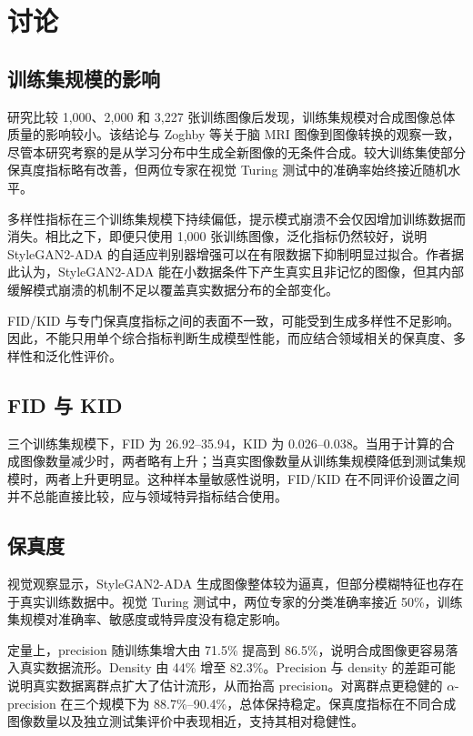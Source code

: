 \documentclass[UTF8,11pt,a4paper]{ctexart}
\begin{document}
\section{讨论}

\subsection{训练集规模的影响}

研究比较 1,000、2,000 和 3,227 张训练图像后发现，训练集规模对合成图像总体质量的影响较小。该结论与 Zoghby 等关于脑 MRI 图像到图像转换的观察一致，尽管本研究考察的是从学习分布中生成全新图像的无条件合成。较大训练集使部分保真度指标略有改善，但两位专家在视觉 Turing 测试中的准确率始终接近随机水平。

多样性指标在三个训练集规模下持续偏低，提示模式崩溃不会仅因增加训练数据而消失。相比之下，即便只使用 1,000 张训练图像，泛化指标仍然较好，说明 StyleGAN2-ADA 的自适应判别器增强可以在有限数据下抑制明显过拟合。作者据此认为，StyleGAN2-ADA 能在小数据条件下产生真实且非记忆的图像，但其内部缓解模式崩溃的机制不足以覆盖真实数据分布的全部变化。

FID/KID 与专门保真度指标之间的表面不一致，可能受到生成多样性不足影响。因此，不能只用单个综合指标判断生成模型性能，而应结合领域相关的保真度、多样性和泛化性评价。

\subsection{FID 与 KID}

三个训练集规模下，FID 为 26.92--35.94，KID 为 0.026--0.038。当用于计算的合成图像数量减少时，两者略有上升；当真实图像数量从训练集规模降低到测试集规模时，两者上升更明显。这种样本量敏感性说明，FID/KID 在不同评价设置之间并不总能直接比较，应与领域特异指标结合使用。

\subsection{保真度}

视觉观察显示，StyleGAN2-ADA 生成图像整体较为逼真，但部分模糊特征也存在于真实训练数据中。视觉 Turing 测试中，两位专家的分类准确率接近 50\%，训练集规模对准确率、敏感度或特异度没有稳定影响。

定量上，precision 随训练集增大由 71.5\% 提高到 86.5\%，说明合成图像更容易落入真实数据流形。Density 由 44\% 增至 82.3\%。Precision 与 density 的差距可能说明真实数据离群点扩大了估计流形，从而抬高 precision。对离群点更稳健的 $\alpha$-precision 在三个规模下为 88.7\%--90.4\%，总体保持稳定。保真度指标在不同合成图像数量以及独立测试集评价中表现相近，支持其相对稳健性。
\end{document}

